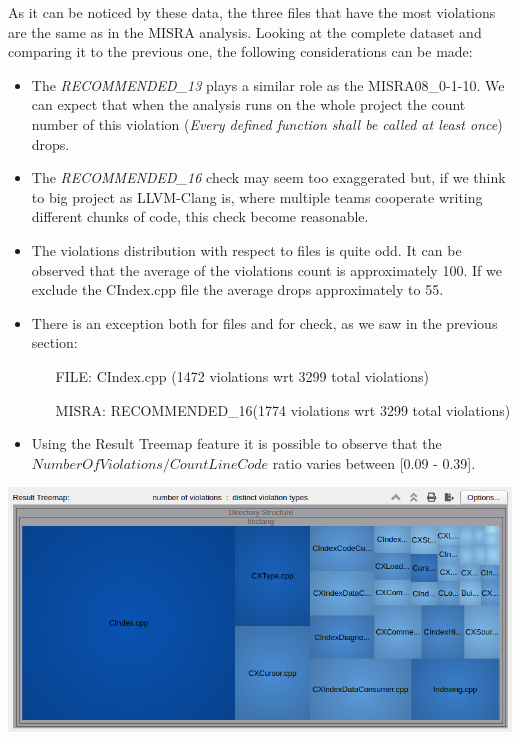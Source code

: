As it can be noticed by these data, the three files that have the most violations are the same as in the MISRA analysis.\newline
Looking at the complete dataset and comparing it to the previous one, the following considerations can be made:
\begin{itemize}
	\item The \textsl{RECOMMENDED\_13} plays a similar role as the MISRA08\_0-1-10. We can expect that when the analysis runs on the whole project the count number of this violation (\textsl{Every defined function shall be called at least once}) drops.
	\item The \textsl{RECOMMENDED\_16} check may seem too exaggerated but, if we think to big project as LLVM-Clang is, where multiple teams cooperate writing different chunks of code, this check become reasonable.
	\item The violations distribution with respect to files is quite odd. It can be observed that the average of the violations count is approximately 100. If we exclude the CIndex.cpp file the average drops approximately to 55.
	\item There is an exception both for files and for check, as we saw in the previous section:
	\begin{itemize}
		\item[FILE: ] CIndex.cpp (1472 violations wrt 3299 total violations)
		\item[MISRA: ] RECOMMENDED\_16(1774 violations wrt 3299 total violations)
	\end{itemize}
	\item Using the Result Treemap feature it is possible to observe that the $NumberOfViolations/CountLineCode$ ratio varies between [0.09 - 0.39].
\end{itemize}

\vspace{1cm}
\begin{minipage}{\linewidth}
	\includegraphics[width=\textwidth]{img/SciToolsViolationsCount.png}
\end{minipage}
\pagebreak

